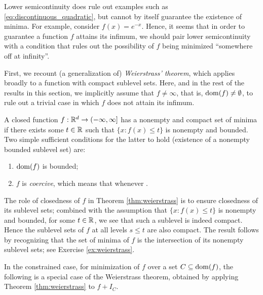 Lower semicontinuity does rule out examples such as
\eqref{eq:discontinuous_quadratic}, but cannot by itself guarantee the existence
of minima. For example, consider $f(x) = e^{-x}$. Hence, it seems that in order
to guarantee a function $f$ attains its infimum, we should pair lower
semicontinuity with a condition that rules out the possibility of $f$ being
minimized ``somewhere off at infinity''.

First, we recount (a generalization of) \emph{Weierstrass' theorem}, which
applies broadly to a function with compact sublevel sets. Here, and in the rest
of the results in this section, we implicitly assume that $f \not= \infty$, that
is, $\operatorname{dom}(f) \not= \emptyset$, to rule out a trivial case in which $f$ does not 
attain its infimum.   

\begin{Theorem}
\label{thm:weierstrass}
A closed function $f : \mathbb{R}^d \to (-\infty, \infty]$ has a nonempty and compact
set of minima if there exists some $t \in \mathbb{R}$ such that $\{ x : f(x) \leq t\}$
is nonempty and bounded. Two simple sufficient conditions for the latter to
hold (existence of a nonempty bounded sublevel set) are:
\begin{enumerate}[label=(\roman*)]
\item $\operatorname{dom}(f)$ is bounded; 
\item $f$ is \emph{coercive}, which means that  whenever .  
\end{enumerate}
\end{Theorem}


The role of closedness of $f$ in Theorem \ref{thm:weierstrass} is to ensure
closedness of its sublevel sets; combined with the assumption that $\{x : f(x)
\leq t\}$ is nonempty and bounded, for some $t \in \mathbb{R}$, we see that such a
sublevel is indeed compact. Hence the sublevel sets of $f$ at all levels $s \leq 
t$ are also compact. The result follows by recognizing that the set of minima
of $f$ is the intersection of its nonempty sublevel sets; see Exercise
\ref{ex:weierstrass}.

In the constrained case, for minimization of $f$ over a set $C \subseteq
\operatorname{dom}(f)$, the following is a special case of the Weierstrass theorem, obtained
by applying Theorem \ref{thm:weierstrass} to $f + I_C$.

